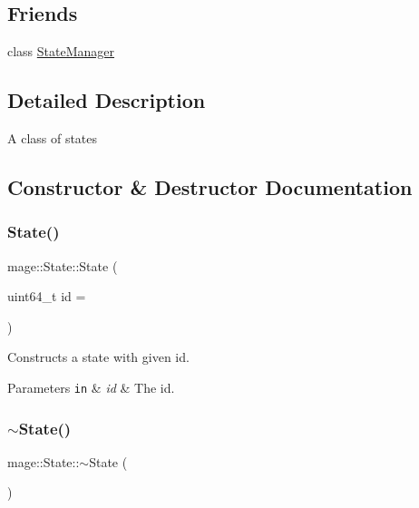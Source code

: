 \subsection*{Friends}
\begin{DoxyCompactItemize}
\item 
class \hyperlink{classmage_1_1_state_a8055e77bf0267832ef337718a11fec0d}{State\+Manager}
\end{DoxyCompactItemize}


\subsection{Detailed Description}
A class of states 

\subsection{Constructor \& Destructor Documentation}
\hypertarget{classmage_1_1_state_ac21bb6de22bb3b9c1b18d98b53e92100}{}\label{classmage_1_1_state_ac21bb6de22bb3b9c1b18d98b53e92100} 
\subsubsection{\texorpdfstring{State()}{State()}}
{\footnotesize\ttfamily mage\+::\+State\+::\+State (\begin{DoxyParamCaption}\item[{uint64\+\_\+t}]{id = {} }\end{DoxyParamCaption})}

Constructs a state with given id.


\begin{DoxyParams}[1]{Parameters}
\mbox{\tt in}  & {\em id} & The id. \\
\hline
\end{DoxyParams}
\hypertarget{classmage_1_1_state_aa970b0dd628870e72a7f7fffcff1db13}{}\label{classmage_1_1_state_aa970b0dd628870e72a7f7fffcff1db13} 
\subsubsection{\texorpdfstring{$\sim$\+State()}{~State()}}
{\footnotesize\ttfamily mage\+::\+State\+::$\sim$\+State (\begin{DoxyParamCaption}{ }\end{DoxyParamCaption})}

